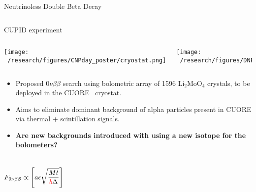 \documentclass[final]{beamer}
\newlength{\colwidth}
\begin{document}
\begin{frame}[t]
\begin{columns}[t]
\begin{column}{\colwidth}
\begin{block}{Neutrinoless Double Beta Decay}
\begin{columns}[c]
    \end{columns}
  \end{block}

  \begin{block}{CUPID experiment}
    \vspace{2cm}
    \begin{columns}[c] %
      
      \column{.4\colwidth} %
      \texttt{[image: ~/research/figures/CNPday\_poster/cryostat.png]}
      
      \column{.5\colwidth} %
      \texttt{[image: ~/research/figures/DNP2021/scintillation.png]}
      
    \end{columns}

    \begin{itemize}
      \item Proposed $0\nu\beta\beta$ search using bolometric array of 1596 Li$_2$MoO$_4$ crystals, to be deployed in the CUORE \ cryostat.
      \item Aims to eliminate dominant background of alpha particles present in CUORE via thermal + scintillation signals.
      \item \textbf{Are new backgrounds introduced with using a new isotope for the bolometers?}
    \end{itemize}


    \begin{columns}[c] %
      
      \column{.4\colwidth} %
        \begin{eqnarray*}
        F_{0\nu\beta\beta} \propto  \left[ a\epsilon \sqrt{\frac{Mt}{\textcolor{red}{b}\Delta}}\right]
        \end{eqnarray*}      
      

\end{columns}
\end{block}
\end{column}
\end{columns}
\end{frame}
\end{document}
